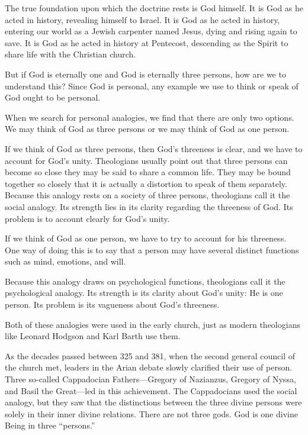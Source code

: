 The true foundation upon which the doctrine rests is God himself. It is God as he acted in history,
revealing himself to Israel. It is God as he acted in history, entering our world as a Jewish
carpenter named Jesus, dying and rising again to save. It is God as he acted in history at
Pentecost, descending as the Spirit to share life with the Christian church.

But if God is eternally one and God is eternally three persons, how are we to understand this? Since
God is personal, any example we use to think or speak of God ought to be personal.

When we search for personal analogies, we find that there are only two options. We may think of God
as three persons or we may think of God as one person.

If we think of God as three persons, then God’s threeness is clear, and we have to account for God’s
unity. Theologians usually point out that three persons can become so close they may be said to
share a common life. They may be bound together so closely that it is actually a distortion to speak
of them separately. Because this analogy rests on a society of three persons, theologians call it
the social analogy. Its strength lies in its clarity regarding the threeness of God. Its problem is
to account clearly for God’s unity.

If we think of God as one person, we have to try to account for his threeness. One way of doing this
is to say that a person may have several distinct functions such as mind, emotions, and will.

Because this analogy draws on psychological functions, theologians call it the psychological
analogy. Its strength is its clarity about God’s unity: He is one person. Its problem is its
vagueness about God’s threeness.

Both of these analogies were used in the early church, just as modern theologians like Leonard
Hodgson and Karl Barth use them.

As the decades passed between 325 and 381, when the second general council of the church met,
leaders in the Arian debate slowly clarified their use of person. Three so-called Cappadocian
Fathers—Gregory of Nazianzus, Gregory of Nyssa, and Basil the Great—led in this achievement. The
Cappadocians used the social analogy, but they saw that the distinctions between the three divine
persons were solely in their inner divine relations. There are not three gods. God is one divine
Being in three “persons.”

